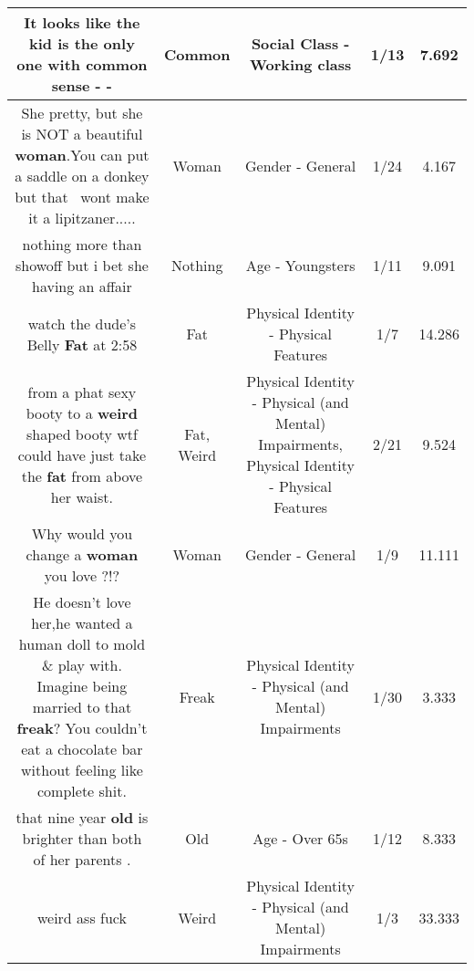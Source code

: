 \documentclass[11pt]{article}
\newlength\mylength
\begin{document}
\begin{center}
\begin{longtable}{|C{.65\mylength}|C{.30\mylength}|C{.12\mylength}|C{.12\mylength}|C{.12\mylength}|}
  \small It looks like the kid is the only one with \textbf{common} sense - -\normalsize   & Common & Social Class - Working class & 1/13 & 7.692 \\  \hline
  \small She pretty, but she is NOT a beautiful \textbf{woman}.You can put a saddle on a donkey but that  wont make it a lipitzaner.....\normalsize   & Woman & Gender - General & 1/24 & 4.167 \\  \hline
  \small nothing more than showoff but i bet she having an affair\normalsize   & Nothing & Age - Youngsters & 1/11 & 9.091 \\  \hline
  \small watch the dude's Belly \textbf{Fat} at 2:58\normalsize   & Fat & Physical Identity - Physical Features & 1/7 & 14.286 \\  \hline
  \small from a phat sexy booty to a \textbf{weird} shaped booty wtf could have just take the \textbf{fat} from above her waist.\normalsize   & Fat, Weird & Physical Identity - Physical (and Mental) Impairments, Physical Identity - Physical Features & 2/21 & 9.524 \\  \hline
  \small Why would you change a \textbf{woman} you love ?!?\normalsize   & Woman & Gender - General & 1/9 & 11.111 \\  \hline
  \small He doesn't love her,he wanted a human doll to mold \& play with. Imagine being married to that \textbf{freak}? You couldn't eat a chocolate bar without feeling like complete shit.\normalsize   & Freak & Physical Identity - Physical (and Mental) Impairments & 1/30 & 3.333 \\  \hline
  \small that nine year \textbf{old} is brighter than both of her parents .\normalsize   & Old & Age - Over 65s & 1/12 & 8.333 \\  \hline
  \small weird ass fuck\normalsize   & Weird & Physical Identity - Physical (and Mental) Impairments & 1/3 & 33.333 \\  \hline

\end{longtable}
\end{center}
\end{document}
